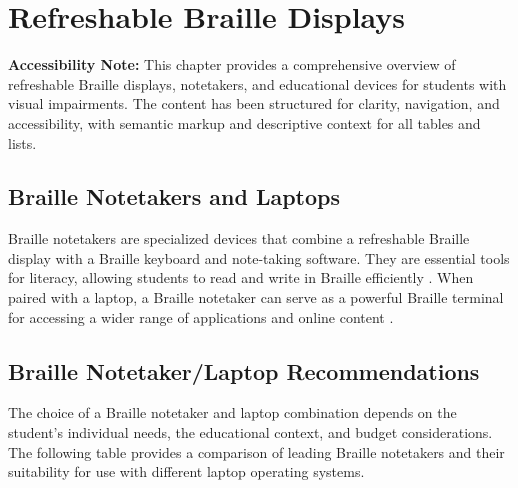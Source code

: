 \chapter{Refreshable Braille Displays}\label{ch3:braille}
\raggedright

\begin{raggedright}
	\textbf{Accessibility Note:} This chapter provides a comprehensive overview of refreshable Braille displays, notetakers, and educational devices for students with visual impairments. The content has been structured for clarity, navigation, and accessibility, with semantic markup and descriptive context for all tables and lists.
\end{raggedright}

\section{Braille Notetakers and Laptops}\label{ch3:sec:notetakers-laptops}
Braille notetakers are specialized devices that combine a refreshable Braille display with a Braille keyboard and note-taking software. They are essential tools for literacy, allowing students to read and write in Braille efficiently \supercite{Holbrook2006, Presley2012, PerkinsNoteTaking, TeachingVI}. When paired with a laptop, a Braille notetaker can serve as a powerful Braille terminal for accessing a wider range of applications and online content \supercite{Kelly2011, Day2021}.

\section{Braille Notetaker/Laptop Recommendations}\label{ch3:sec:notetaker-laptop-recs}
The choice of a Braille notetaker and laptop combination depends on the student's individual needs, the educational context, and budget considerations. The following table provides a comparison of leading Braille notetakers and their suitability for use with different laptop operating systems.

